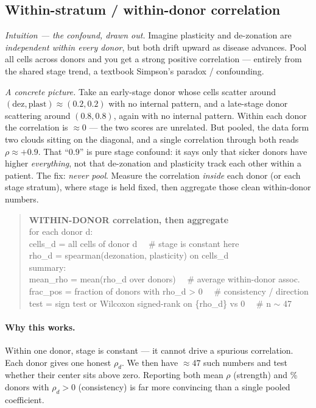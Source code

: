 \documentclass[11pt]{article}
\newcommand{\dez}{\text{dez}}
\newcommand{\plast}{\text{plast}}
\begin{document}
\subsection{Within-stratum / within-donor correlation}

\textit{Intuition --- the confound, drawn out.} Imagine plasticity and de-zonation are \emph{independent within every donor}, but both drift upward as disease advances. Pool all cells across donors and you get a strong positive correlation --- entirely from the shared stage trend, a textbook Simpson's paradox / confounding.

\emph{A concrete picture.} Take an early-stage donor whose cells scatter around $(\dez,\plast)\approx(0.2,0.2)$ with no internal pattern, and a late-stage donor scattering around $(0.8,0.8)$, again with no internal pattern. Within each donor the correlation is $\approx 0$ --- the two scores are unrelated. But pooled, the data form two clouds sitting on the diagonal, and a single correlation through both reads $\rho\approx +0.9$. That ``$0.9$'' is pure stage confound: it says only that sicker donors have higher \emph{everything}, not that de-zonation and plasticity track each other within a patient. The fix: \emph{never pool}. Measure the correlation \emph{inside} each donor (or each stage stratum), where stage is held fixed, then aggregate those clean within-donor numbers.

\begin{quote}
\ttfamily
\textbf{WITHIN-DONOR correlation, then aggregate}\\
for each donor d:\\
\hspace*{2em}cells\_d = all cells of donor d \ \ \# stage is constant here\\
\hspace*{2em}rho\_d = spearman(dezonation, plasticity) on cells\_d\\
summary:\\
\hspace*{2em}mean\_rho = mean(rho\_d over donors) \ \ \# average within-donor assoc.\\
\hspace*{2em}frac\_pos = fraction of donors with rho\_d > 0 \ \ \# consistency / direction\\
\hspace*{2em}test = sign test or Wilcoxon signed-rank on \{rho\_d\} vs 0 \ \ \# n $\sim$ 47
\end{quote}

\paragraph{Why this works.} Within one donor, stage is constant --- it cannot drive a spurious correlation. Each donor gives one honest $\rho_d$. We then have $\approx 47$ such numbers and test whether their center sits above zero. Reporting both mean $\rho$ (strength) and \% donors with $\rho_d>0$ (consistency) is far more convincing than a single pooled coefficient.
\end{document}
